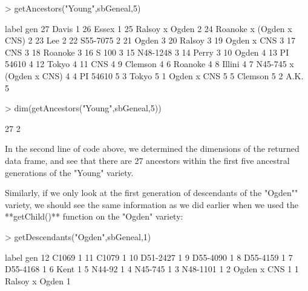\documentclass{article}
\numberwithin{equation}{section} %
\begin{document}
\begin{Schunk}
\begin{Sinput}
> getAncestors("Young",sbGeneal,5)
\end{Sinput}
\begin{Soutput}
                     label gen
27                   Davis   1
26                   Essex   1
25          Ralsoy x Ogden   2
24 Roanoke x (Ogden x CNS)   2
23                     Lee   2
22                S55-7075   2
21                   Ogden   3
20                  Ralsoy   3
19             Ogden x CNS   3
17                     CNS   3
18                 Roanoke   3
16                   S 100   3
15                N48-1248   3
14                   Perry   3
10                   Ogden   4
13                PI 54610   4
12                   Tokyo   4
11                     CNS   4
9                  Clemson   4
6                  Roanoke   4
8                   Illini   4
7  N45-745 x (Ogden x CNS)   4
4                 PI 54610   5
3                    Tokyo   5
1              Ogden x CNS   5
5                  Clemson   5
2                     A.K.   5
\end{Soutput}
\begin{Sinput}
> dim(getAncestors("Young",sbGeneal,5))
\end{Sinput}
\begin{Soutput}
[1] 27  2
\end{Soutput}
\end{Schunk}

In the second line of code above, we determined the dimensions of the returned data frame, and see that there are 27 ancestors within the first five ancestral generations of the "Young" variety.

Similarly, if we only look at the first generation of descendants of the "Ogden"" variety, we should see the same information as we did earlier when we used the **getChild()** function on the "Ogden" variety:

\begin{Schunk}
\begin{Sinput}
> getDescendants("Ogden",sbGeneal,1)
\end{Sinput}
\begin{Soutput}
            label gen
12          C1069   1
11          C1079   1
10       D51-2427   1
9        D55-4090   1
8        D55-4159   1
7        D55-4168   1
6            Kent   1
5          N44-92   1
4         N45-745   1
3        N48-1101   1
2     Ogden x CNS   1
1  Ralsoy x Ogden   1
\end{Soutput}
\end{Schunk}
\end{document}
